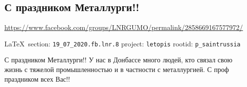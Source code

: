 
 
\subsection{С праздником Металлурги!!}
\url{https://www.facebook.com/groups/LNRGUMO/permalink/2858669167577972/}
  
\vspace{0.5cm}
{\small\LaTeX~section: \verb|19_07_2020.fb.lnr.8| project: \verb|letopis| rootid: \verb|p_saintrussia|}
\vspace{0.5cm}

С праздником Металлурги!! У нас в Донбассе много людей, кто связал свою жизнь
с тяжелой промышленностью и в частности с металлургией. С проф праздником всех
Вас!!  

